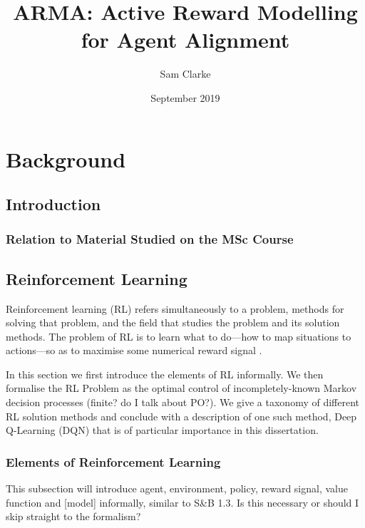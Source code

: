 \documentclass[11pt, a4paper, bibliography=totoc]{report}
\begin{document}
\title{ARMA: Active Reward Modelling for Agent Alignment}
\author{Sam Clarke}
\date{September 2019}
\renewcommand{\bibname}{References}
\maketitle

\begin{abstract} %

\end{abstract}

\tableofcontents

\part{Background}

\chapter{Introduction}

\section{Relation to Material Studied on the MSc Course}

\chapter{Reinforcement Learning} %
Reinforcement learning (RL) refers simultaneously to a problem, methods for solving that problem, and the field that studies the problem and its solution methods. The problem of RL is to learn what to do---how to map situations to actions---so as to maximise some numerical reward signal \cite[pp.~1-2]{Sutton2018}.

In this section we first introduce the elements of RL informally. We then formalise the RL Problem as the optimal control of incompletely-known Markov decision processes (finite? do I talk about PO?). We give a taxonomy of different RL solution methods and conclude with a description of one such method, Deep Q-Learning (DQN) that is of particular importance in this dissertation.

\section{Elements of Reinforcement Learning}
This subsection will introduce agent, environment, policy, reward signal, value function and [model] informally, similar to S\&B 1.3. Is this necessary or should I skip straight to the formalism?
\end{document}
